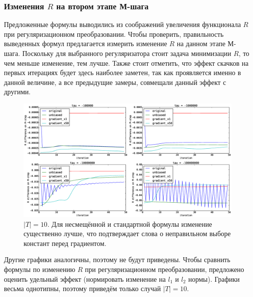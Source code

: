 \documentclass[12pt]{article}
\begin{document}
\subsubsection{Изменения $R$ на втором этапе М-шага}
Предложенные формулы выводились из соображений увеличения функционала $R$ при регуляризационном преобразовании. Чтобы проверить, правильность выведенных формул предлагается измерить изменение $R$ на данном этапе М-шага. Поскольку для выбранного регуляризатора стоит задача минимизации $R$, то чем меньше изменение, тем лучше. Также стоит отметить, что эффект скачков на первых итерациях будет здесь наиболее заметен, так как проявляется именно в данной величине, а все предыдущие замеры, совмещали данный эффект с другими.
\begin{figure}[H]
	\centering
	\caption{$|T| = 10$. Для несмещённой и стандартной формулы изменение существенно лучше, что подтверждает слова о неправильном выборе констант перед градиентом.}    
	\includegraphics[width=1.0\linewidth]{pictures/topics_10_RMstepDiff}
\end{figure}

Другие графики аналогичны, поэтому не будут приведены. Чтобы сравнить формулы по изменению $R$ при регуляризационном преобразовании, предложено оценить удельный эффект (нормировать изменение на $l_1$ и $l_2$ нормы). Графики весьма однотипны, поэтому приведём только случай $|T| = 10$.
\end{document}
